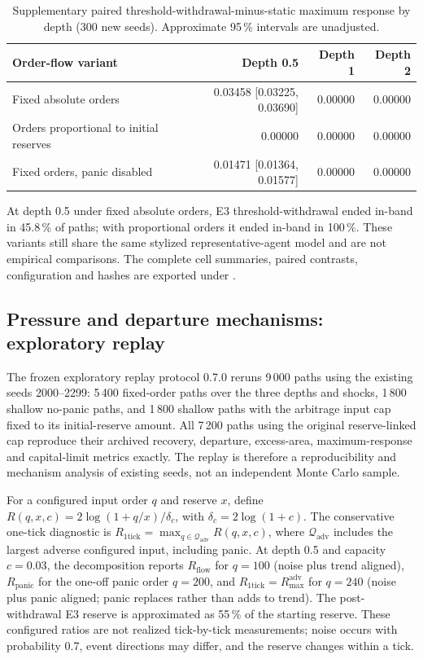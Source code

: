 \begin{table}[htbp]
\centering
\caption{Supplementary paired threshold-withdrawal-minus-static maximum response by depth (300 new seeds). Approximate 95\,\% intervals are unadjusted.}
\label{tab:engineering-sensitivity}
\small
\begin{tabular}{@{}lrrr@{}}
\toprule
Order-flow variant & Depth 0.5 & Depth 1 & Depth 2 \\
\midrule
Fixed absolute orders & 0.03458 [0.03225, 0.03690] & 0.00000 & 0.00000 \\
Orders proportional to initial reserves & 0.00000 & 0.00000 & 0.00000 \\
Fixed orders, panic disabled & 0.01471 [0.01364, 0.01577] & 0.00000 & 0.00000 \\
\bottomrule
\end{tabular}
\end{table}

At depth 0.5 under fixed absolute orders, E3 threshold-withdrawal ended in-band in 45.8\,\% of paths; with proportional orders it ended in-band in 100\,\%. These variants still share the same stylized representative-agent model and are not empirical comparisons. The complete cell summaries, paired contrasts, configuration and hashes are exported under .

\subsection{Pressure and departure mechanisms: exploratory replay}

The frozen exploratory replay protocol 0.7.0 reruns 9\,000 paths using the existing seeds 2000--2299: 5\,400 fixed-order paths over the three depths and shocks, 1\,800 shallow no-panic paths, and 1\,800 shallow paths with the arbitrage input cap fixed to its initial-reserve amount. All 7\,200 paths using the original reserve-linked cap reproduce their archived recovery, departure, excess-area, maximum-response and capital-limit metrics exactly. The replay is therefore a reproducibility and mechanism analysis of existing seeds, not an independent Monte Carlo sample.

For a configured input order $q$ and reserve $x$, define $R(q,x,c)=2\log(1+q/x)/\delta_c$, with $\delta_c=2\log(1+c)$. The conservative one-tick diagnostic is $R_{\mathrm{1tick}}=\max_{q\in\mathcal Q_{\mathrm{adv}}}R(q,x,c)$, where $\mathcal Q_{\mathrm{adv}}$ includes the largest adverse configured input, including panic. At depth 0.5 and capacity $c=0.03$, the decomposition reports $R_{\mathrm{flow}}$ for $q=100$ (noise plus trend aligned), $R_{\mathrm{panic}}$ for the one-off panic order $q=200$, and $R_{\mathrm{1tick}}=R_{\max}^{\mathrm{adv}}$ for $q=240$ (noise plus panic aligned; panic replaces rather than adds to trend). The post-withdrawal E3 reserve is approximated as 55\,\% of the starting reserve. These configured ratios are not realized tick-by-tick measurements; noise occurs with probability 0.7, event directions may differ, and the reserve changes within a tick.


